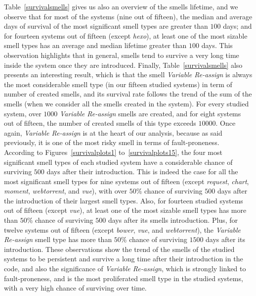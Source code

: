\documentclass[smallcondensed]{svjour3}
\begin{document}
Table~\ref{survivalsmells} gives us also an overview of the smells lifetime, and we observe that for most of the systems (nine out of fifteen), the median and average days of survival of the most significant smell types are greater than $100$ days; and for fourteen systems out of fifteen (except \textsl{hexo}), at least one of the most sizable smell types has an average and median lifetime greater than $100$ days. This observation highlights that in general, smells tend to survive a very long time inside the system once they are introduced. Finally, Table~\ref{survivalsmells} also presents an interesting result, which is that the smell \textsl{Variable Re-assign} is always the most considerable smell type (in our fifteen studied systems) in term of number of created smells, and its survival rate follows the trend of the sum of the smells (when we consider all the smells created in the system). For every studied system, over $1000$ \textsl{Variable Re-assign} smells are created, and for eight systems out of fifteen, the number of created smells of this type exceeds $10000$. Once again, \textsl{Variable Re-assign} is at the heart of our analysis, because as said previously, it is one of the most risky smell in terms of fault-proneness.\\
According to Figures~\ref{survivalplots1} to~\ref{survivalplots15}, the four most significant smell types of each studied system have a considerable chance of surviving $500$ days after their introduction. This is indeed the case for all the most significant smell types for nine systems out of fifteen (except \textsl{request}, \textsl{chart}, \textsl{moment}, \textsl{webtorrent}, and \textsl{vue}), with over $50$\% chance of surviving $500$ days after the introduction of their largest smell types. Also, for fourteen studied systems out of fifteen (except \textsl{vue}), at least one of the most sizable smell types has more than $50$\% chance of surviving $500$ days after its smells introduction. Plus, for twelve systems out of fifteen (except \textsl{bower}, \textsl{vue}, and \textsl{webtorrent}), the \textsl{Variable Re-assign} smell type has more than $50$\% chance of surviving $1500$ days after its introduction. These observations show the trend of the smells of the studied systems to be persistent and survive a long time after their introduction in the code, and also the significance of \textsl{Variable Re-assign}, which is strongly linked to fault-proneness, and is the most proliferated smell type in the studied systems, with a very high chance of surviving over time.
\end{document}

